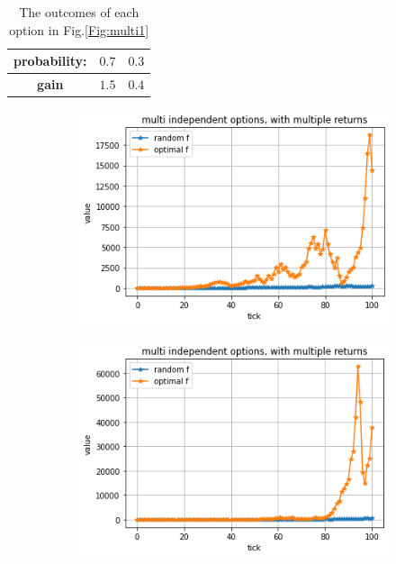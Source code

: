 \documentclass{article}
\begin{document}
	\newpage	
	
	\begin{table}[!h]
		\centering\begin{tabular}{|c||c|c|}
			\hline
			\textbf{probability:} & $0.7$ & $0.3$  \\ 
			\hline
			\textbf{gain} & $1.5$ & $0.4$ \\
			\hline
		\end{tabular}
		\caption{The outcomes of each option in Fig.\ref{Fig:multi1}}
		\label{table:options1}
	\end{table}
	
	\begin{figure}[!h]
		\begin{subfigure}{0.525\textwidth}
			\includegraphics[width=0.9\linewidth]{multi1} 
		\end{subfigure}
		\begin{subfigure}{0.525\textwidth}
			\includegraphics[width=0.9\linewidth]{multi2}
		\end{subfigure}

\end{figure}
\end{document}
